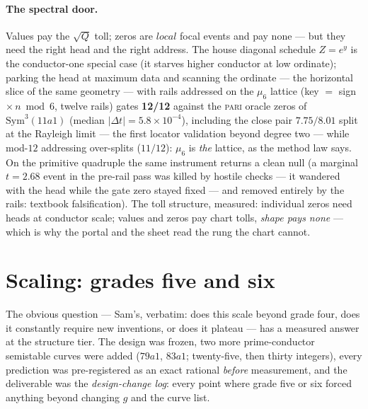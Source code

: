 \documentclass[11pt]{article}
\theoremstyle{definition}
\theoremstyle{remark}
\begin{document}
\paragraph{The spectral door.} Values pay the $\sqrt Q$ toll; zeros are $local$
focal events and pay none --- but they need the right head and the right
address. The house diagonal schedule $Z=e^y$ is the conductor-one special
case (it starves higher conductor at low ordinate); parking the head at
maximum data and scanning the ordinate --- the horizontal slice of the same
geometry --- with rails addressed on the $\mu_6$ lattice
(key $=$ sign $\times\,n\bmod6$, twelve rails) gates \textbf{12/12} against
the \textsc{pari} oracle zeros of $\mathrm{Sym}^3(11a1)$ (median
$|\Delta t|=5.8\times10^{-4}$), including the close pair $7.75/8.01$ split at
the Rayleigh limit --- the first locator validation beyond degree two ---
while mod-$12$ addressing over-splits ($11/12$): $\mu_6$ is \emph{the}
lattice, as the method law says. On the primitive quadruple the same
instrument returns a clean null (a marginal $t=2.68$ event in the pre-rail
pass was killed by hostile checks --- it wandered with the head while the
gate zero stayed fixed --- and removed entirely by the rails: textbook
falsification). The toll structure, measured: individual zeros need heads at
conductor scale; values and zeros pay chart tolls, \emph{shape pays none} ---
which is why the portal and the sheet read the rung the chart cannot.

\section{Scaling: grades five and six}\label{sec:scaling}

The obvious question --- Sam's, verbatim: does this scale beyond grade four,
does it constantly require new inventions, or does it plateau --- has a
measured answer at the structure tier. The design was frozen, two more
prime-conductor semistable curves were added ($79a1$, $83a1$; twenty-five,
then thirty integers), every prediction was pre-registered as an exact
rational \emph{before} measurement, and the deliverable was the
\emph{design-change log}: every point where grade five or six forced anything
beyond changing $g$ and the curve list.
\end{document}
